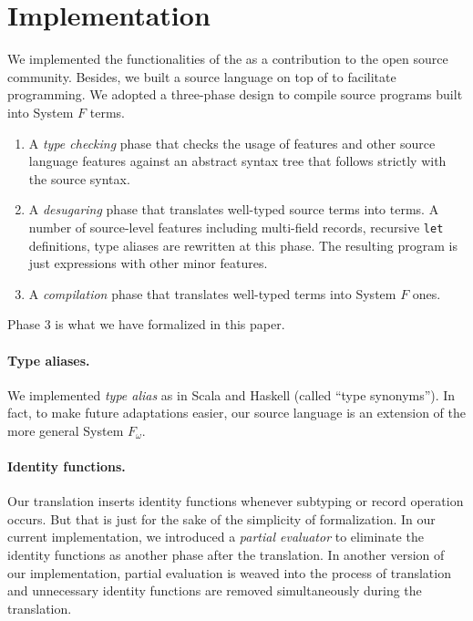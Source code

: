 \section{Implementation}

We implemented the functionalities of the \name as a contribution to the open
source community. Besides, we built a source language on top of \name to
facilitate programming. We adopted a three-phase design to compile source
programs built into System $F$ terms.
\begin{enumerate}
\item A \emph{type checking} phase that checks the usage of \name features and
  other source language features against an abstract syntax tree that follows
  strictly with the source syntax.

\item A \emph{desugaring} phase that translates well-typed source terms into
  \name terms. A number of source-level features including multi-field records,
  recursive \texttt{let} definitions, type aliases are rewritten at this phase.
  The resulting program is just \name expressions with other minor features.

\item A \emph{compilation} phase that translates well-typed \name terms into
  System $F$ ones.
\end{enumerate}
Phase 3 is what we have formalized in this paper.

\paragraph{Type aliases.} We implemented \emph{type alias} as in Scala and
Haskell (called ``type synonyms''). In fact, to make future adaptations easier,
our source language is an extension of the more general System $F_{\omega}$.

\paragraph{Identity functions.} Our translation inserts identity functions
whenever subtyping or record operation occurs. But that is just for the sake of
the simplicity of formalization. In our current implementation, we introduced a
\emph{partial evaluator} to eliminate the identity functions as another phase
after the translation. In another version of our implementation, partial
evaluation is weaved into the process of translation and unnecessary identity
functions are removed simultaneously during the translation.
